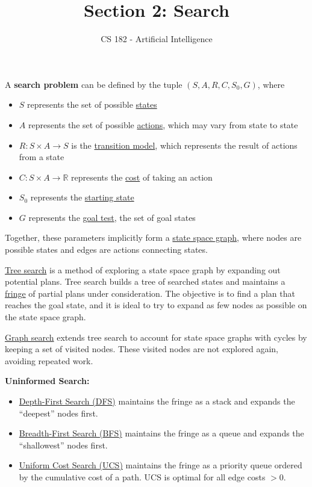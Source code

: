 \documentclass[11pt]{article}
\title{Section 2: Search}
\author{CS 182 - Artificial Intelligence}
\date{}
\begin{document}
\maketitle


\renewcommand{\labelenumii}{\arabic{enumii}.}
\setlength{\parindent}{0pt}

A \textbf{search problem} can be defined by the tuple
$(S, A, R, C, S_0, G)$, where
\begin{itemize}
\item $S$ represents the set of possible \underline{states}

\item $A$ represents the set of possible \underline{actions}, which may vary
from state to state

\item $R : S \times A \rightarrow S$ is the \underline{transition model},
which represents the result of actions from a state

\item $C : S \times A \rightarrow \mathbb{R}$ represents the \underline{cost}
of taking an action

\item $S_0$ represents the \underline{starting state}

\item $G$ represents the \underline{goal test}, the set of {goal states}
\end{itemize}

Together, these parameters implicitly form a \underline{state space graph},
where nodes are possible states and edges are actions connecting states.

\underline{Tree search} is a method of exploring a state space graph by expanding out potential plans. Tree search builds a tree of searched states and maintains a \underline{fringe} of partial plans under consideration. The objective is to find a plan that reaches the goal state, and it is ideal to try to expand as few nodes as possible on the state space graph.

\underline{Graph search} extends tree search to account for state space graphs with cycles by keeping a set of visited nodes. These visited nodes are not explored again, avoiding repeated work.

\textbf{Uninformed Search:}
\vspace{-10pt}
\begin{itemize}
\item \underline{Depth-First Search ({DFS})} maintains the fringe as a stack and expands the ``deepest'' nodes first.

\item \underline{Breadth-First Search ({BFS})} maintains the fringe as a queue and expands the ``shallowest'' nodes first.

\item \underline{Uniform Cost Search ({UCS})} maintains the fringe as a priority queue ordered by the cumulative cost of a path. UCS is optimal for all edge costs $>0$.

\end{itemize}
\end{document}
